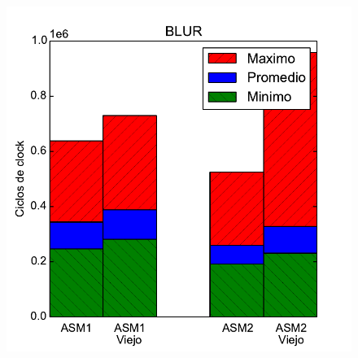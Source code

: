 \begin{figure}[h!]
	\centering
	\includegraphics[scale=0.45]{images/blur_comparationOLD}
\end{figure}

\newpage




